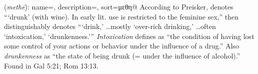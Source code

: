 \item[Drunkenness,]

(\textit{methē}):
{
    name=,
    description={},
    sort=μεθη@
}
According to Preisker,  denotes ```drunk' (with wine). In early lit. use is restricted to the feminine sex,'' then  distinguishably denotes ```drink,' \ldots mostly `over-rich drinking,' \ldots often `intoxication,' `drunkenness.'''
\emph{Intoxication} defines as ``the condition of having lost some control of your actions or behavior under the influence of a drug.'' Also \emph{drunkenness}  as ``the state of being drunk (= under the influence of alcohol).''
Found in Gal 5:21; Rom 13:13.
